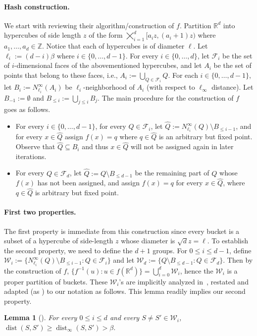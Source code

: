 \documentclass[11pt,letterpaper]{article}
\theoremstyle{plain}
\newtheorem{lemma}[theorem]{Lemma}
\theoremstyle{definition}
\theoremstyle{remark}
\def\ZZ{{\mathbb{Z}}}
\DeclareMathOperator{\dist}{dist}
\begin{document}
\paragraph{Hash construction.}
We start with reviewing their algorithm/construction of $f$.
Partition $\mathbb{R}^{d}$ into hypercubes of side length $z$ of the form $\bigtimes_{i = 1}^d [a_i z, (a_i+1)z)$ where $a_1, \ldots, a_d \in \ZZ$. 
Notice that each of hypercubes is of diameter $\ell$. 
Let $\ell_{i}:= (d-i)\beta$ where $i\in\{0, \ldots, d-1\}$. 
For every $i\in\{0, \ldots, d\}$, let $\mathcal{F}_{i}$ be the set of $i$-dimensional faces of the abovementioned hypercubes,
and let $A_{i}$ be the set of points that belong to these faces, i.e., $A_i := \bigcup_{Q \in \mathcal{F}_i} Q$.
For each $i\in\{0, \ldots, d-1\}$, let $B_{i}:= N_{\ell_{i}}^{\infty}(A_{i})$ be $\ell_{i}$-neighborhood of $A_{i}$ (with respect to $\ell_\infty$ distance). 
Let $B_{-1}:= \emptyset$ and $B_{\leq i}:= \bigcup_{j\leq i}B_{j}$. 
The main procedure for the construction of $f$ goes as follows.
\begin{itemize}
\item For every $i\in\{0, \ldots, d-1\}$, for every $Q\in \mathcal{F}_{i}$, let $\widehat{Q} := N_{\ell_{i}}^{\infty}(Q)\setminus B_{\leq i-1}$, and for every $x\in\widehat{Q}$ assign $f(x)=q$ where $q\in\widehat{Q}$ is an arbitrary but fixed point. 
    Observe that $\widehat{Q}\subseteq B_{i}$ and thus $x\in\widehat{Q}$ will not be assigned again in later iterations. 
    \item For every $Q\in \mathcal{F}_{d}$, let $\widehat{Q} := Q\setminus B_{\leq d-1}$ be the remaining part of $Q$ whose $f(x)$ has not been assigned, and assign $f(x)=q$ for every $x\in\widehat{Q}$, where $q\in\widehat{Q}$ is arbitrary but fixed point. 
\end{itemize}  

\paragraph{First two properties.}
The first property is immediate from this construction since every bucket is a subset of a hypercube of side-length $z$ whose diameter is $\sqrt{d} z = \ell$.
To establish the second property, we need to define the $d + 1$ groups.
For $0\leq i\leq d-1$, define $\mathcal{W}_{i}:= \{N_{\ell_{i}}^{\infty}(Q)\setminus B_{\leq i-1}: Q\in \mathcal{F}_{i} \}$ and let $\mathcal{W}_{d}:=\{Q\setminus B_{\leq d-1}: Q\in \mathcal{F}_{d}\}$. 
Then by the construction of $f$, $\{f^{-1}(u): u\in f(\mathbb{R}^{d})\} = \bigcup_{i=0}^{d}\mathcal{W}_{i}$, hence the $\mathcal{W}_i$ is a proper partition of buckets.
These $\mathcal{W}_i$'s are implicitly analyzed in~\cite[Lemma 5.5 and Lemma 5.8]{arxiv.2204.02095}, restated and adapted (as ) to our notation as follows.
This lemma readily implies our second property.
\begin{lemma}[{\cite[Lemma 5.5 and Lemma 5.8]{arxiv.2204.02095}}]
    \label{lemma:separation}
    For every $0 \leq i \leq d$ and every $S \neq S' \in \mathcal{W}_i$, $\dist(S, S') \geq \dist_\infty(S, S') > \beta$.
\end{lemma}
\end{document}
